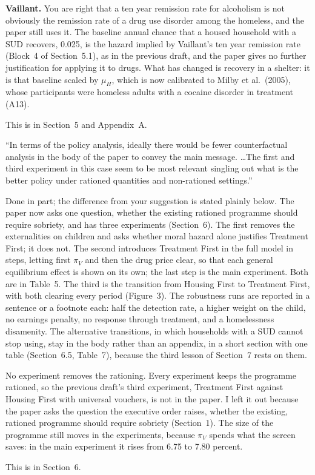 \documentclass[11pt]{article}
\begin{document}
\begin{response}
\textbf{Vaillant.} \open You are right that a ten year remission rate for
alcoholism is not obviously the remission rate of a drug use disorder among the
homeless, and the paper still uses it. The baseline annual chance that a housed
household with a SUD recovers, 0.025, is the hazard implied by Vaillant's ten year
remission rate (Block~4 of Section~5.1), as in the previous draft, and the paper
gives no further justification for applying it to drugs. What has changed is
recovery in a shelter: it is that baseline scaled by $\mu_H$, which is now
calibrated to Milby et al.\ (2005), whose participants were homeless adults with a
cocaine disorder in treatment (A13).

This is in Section~5 and Appendix~A.
\end{response}

\begin{referee}
``In terms of the policy analysis, ideally there would be fewer counterfactual
analysis in the body of the paper to convey the main message. \dots The first and
third experiment in this case seem to be most relevant singling out what is the
better policy under rationed quantities and non-rationed settings.''
\end{referee}
\begin{response}
Done in part; the difference from your suggestion is stated plainly below. The
paper now asks one question, whether the existing rationed programme should require
sobriety, and has three experiments (Section~6). The first removes the
externalities on children and asks whether moral hazard alone justifies Treatment
First; it does not. The second introduces Treatment First in the full model in
steps, letting first $\pi_V$ and then the drug price clear, so that each general
equilibrium effect is shown on its own; the last step is the main experiment. Both
are in Table~5. The third is the transition from Housing First to Treatment First,
with both clearing every period (Figure~3). The robustness runs are reported in a
sentence or a footnote each: half the detection rate, a higher weight on the child,
no earnings penalty, no response through treatment, and a homelessness disamenity.
The alternative transitions, in which households with a SUD cannot stop using, stay
in the body rather than an appendix, in a short section with one table
(Section~6.5, Table~7), because the third lesson of Section~7 rests on them.

\open No experiment removes the rationing. Every experiment keeps the programme
rationed, so the previous draft's third experiment, Treatment First against
Housing First with universal vouchers, is not in the paper. I left it out because
the paper asks the question the executive order raises, whether the existing,
rationed programme should require sobriety (Section~1). The size of the programme
still moves in the experiments, because $\pi_V$ spends what the screen saves: in
the main experiment it rises from 6.75 to 7.80 percent.

This is in Section~6.
\end{response}
\end{document}
